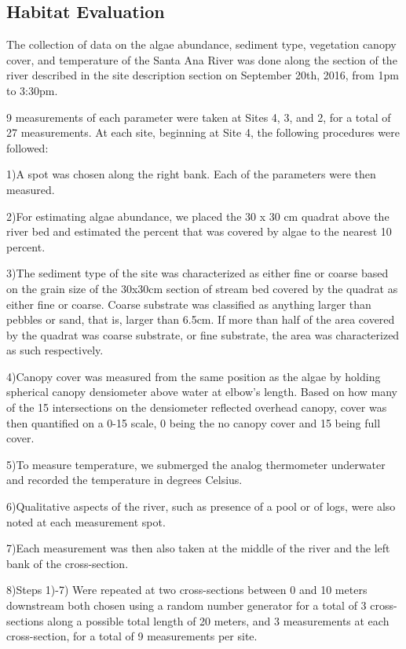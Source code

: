 \documentclass{article}\usepackage[]{graphicx}\usepackage[]{color}
\begin{document}
\subsection{Habitat Evaluation}

The collection of data on the algae abundance, sediment type, vegetation canopy cover, 
and temperature of the Santa Ana River was done along the section of the river described
in the site description section on September 20th, 2016, from 1pm to 3:30pm.

9 measurements of each parameter were taken at Sites 4, 3, and 2, for a total of 27 measurements. 
At each site, beginning at Site 4, the following procedures were followed: 

1)A spot was chosen along the right bank. Each of the parameters were then measured.

2)For estimating algae abundance, we placed the 30  x 30 cm quadrat above the river bed and estimated
the percent that was covered by algae to the nearest 10 percent.

3)The sediment type of the site was characterized as either fine or coarse based on the grain size of the 30x30cm section of stream bed covered by the quadrat as either fine or coarse. Coarse substrate was classified as anything larger than pebbles or sand, that is, larger than 6.5cm. If more than half of the area covered by the quadrat was coarse substrate, or fine substrate, the area was characterized as such respectively.

4)Canopy cover was measured from the same position as the algae by holding spherical canopy densiometer above water at elbow’s length. Based on how many of the 15 intersections on the densiometer reflected overhead canopy, cover was then quantified on a 0-15 scale, 0 being the no canopy cover and 15 being full cover.

5)To measure temperature, we submerged the analog thermometer underwater and recorded the temperature in degrees Celsius.

6)Qualitative aspects of the river, such as presence of a pool or of logs, were also noted at each measurement spot.

7)Each measurement was then also taken at the middle of the river and the left bank of the cross-section. 

8)Steps 1)-7) Were repeated at two cross-sections between 0 and 10 meters downstream both chosen using a random number generator for a total of 3 cross-sections along a possible total length of 20 meters, and 3 measurements at each cross-section, for a total of 9 measurements per site. 
\end{document}
